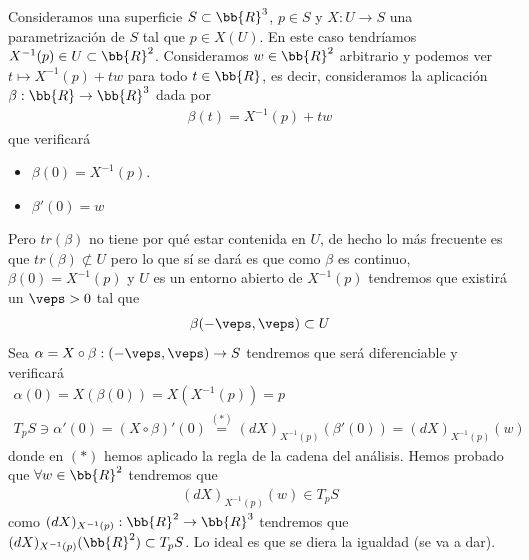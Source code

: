 \begin{observacion}
    Consideramos una superficie $S\subset \bb{R}^3$, $p\in S$ y $X:U\to S$ una parametrización de $S$ tal que $p\in X(U)$. En este caso tendríamos $X^{-1}(p)\in U \subset \bb{R}^2$. Consideramos $w\in \bb{R}^2$ arbitrario y podemos ver $t \mapsto X^{-1}(p)+tw$ para todo $t\in \bb{R}$, es decir, consideramos la aplicación $\beta: \bb{R} \to \bb{R}^3$ dada por 
    \begin{gather*}
        \beta(t) = X^{-1}(p) + tw
    \end{gather*}
    que verificará
    \begin{itemize}
        \item $\beta(0)=X^{-1}(p)$.
        \item $\beta'(0) = w$
    \end{itemize}
    Pero $tr(\beta)$ no tiene por qué estar contenida en $U$, de hecho lo más frecuente es que $tr(\beta)\not\subset U$ pero lo que sí se dará es que como $\beta$ es continuo, $\beta(0)=X^{-1}(p)$ y $U$ es un entorno abierto de $X^{-1}(p)$ tendremos que existirá un $\veps >0$ tal que 
    \begin{gather*}
        \beta (-\veps, \veps) \subset U
    \end{gather*}
    Sea $\alpha = X \circ \beta : (-\veps, \veps) \to S$ tendremos que será diferenciable y verificará 
    \begin{gather*}
        \alpha(0)=X(\beta(0)) = X(X^{-1}(p)) = p\\
        T_pS \owns \alpha'(0) = (X \circ \beta)'(0) \overset{(\ast)}{=} (dX)_{X^{-1}(p)}(\beta'(0)) = (dX)_{X^{-1}(p)}(w)
    \end{gather*}
    donde en $(\ast)$ hemos aplicado la regla de la cadena del análisis. Hemos probado que $\forall w \in \bb{R}^2$ tendremos que
    \begin{gather*}
        (dX)_{X^{-1}(p)}(w)\in T_pS
    \end{gather*}
    como $(dX)_{X^{-1}(p)} : \bb{R}^2 \to \bb{R}^3$ tendremos que $(dX)_{X^{-1}(p)}(\bb{R}^2)\subset T_pS$. Lo ideal es que se diera la igualdad (se va a dar). \\
    

\end{observacion}
